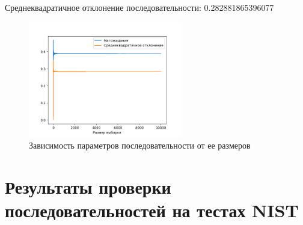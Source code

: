 \documentclass[spec, och, labwork]{shiza}
\begin{document}
\begin{enumerate}
  Среднеквадратичное отклонение последовательности: 0.282881865396077
  \begin{figure}[H]
    \centering
    \includegraphics[width=0.6\textwidth]{pic/bbs}
    \caption{Зависимость параметров последовательности от ее размеров}
    \label{fig:img1}
  \end{figure}
\end{enumerate}

\section{Результаты проверки последовательностей на тестах NIST}
\begin{table}[H]
\end{table}
\end{document}
